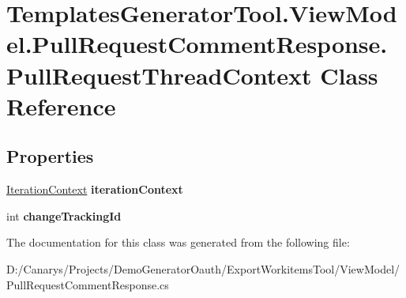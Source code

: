 \hypertarget{class_templates_generator_tool_1_1_view_model_1_1_pull_request_comment_response_1_1_pull_request_thread_context}{}\section{Templates\+Generator\+Tool.\+View\+Model.\+Pull\+Request\+Comment\+Response.\+Pull\+Request\+Thread\+Context Class Reference}
\label{class_templates_generator_tool_1_1_view_model_1_1_pull_request_comment_response_1_1_pull_request_thread_context}
\subsection*{Properties}
\begin{DoxyCompactItemize}
\item 
\mbox{\label{class_templates_generator_tool_1_1_view_model_1_1_pull_request_comment_response_1_1_pull_request_thread_context_a7b99e01367e01b6a58722709d25e59ff}} 
\mbox{\hyperlink{class_templates_generator_tool_1_1_view_model_1_1_pull_request_comment_response_1_1_iteration_context}{Iteration\+Context}} {\bfseries iteration\+Context}
\item 
\mbox{\label{class_templates_generator_tool_1_1_view_model_1_1_pull_request_comment_response_1_1_pull_request_thread_context_ae54ea45a8ee907551112df7334517fed}} 
int {\bfseries change\+Tracking\+Id}
\end{DoxyCompactItemize}


The documentation for this class was generated from the following file\+:\begin{DoxyCompactItemize}
\item 
D\+:/\+Canarys/\+Projects/\+Demo\+Generator\+Oauth/\+Export\+Workitems\+Tool/\+View\+Model/Pull\+Request\+Comment\+Response.\+cs\end{DoxyCompactItemize}
